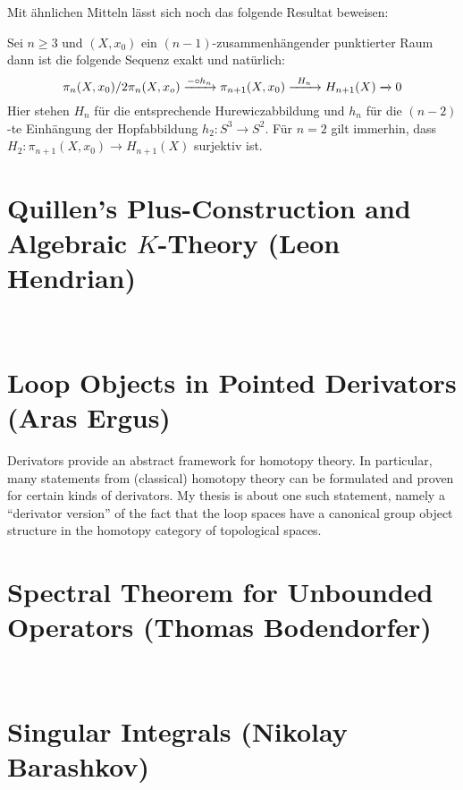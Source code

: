 Mit ähnlichen Mitteln lässt sich noch das folgende Resultat beweisen:
\begin{satz}
Sei $n \geq 3$ und $(X,x_0)$ ein $(n-1)$-zusammenhängender punktierter Raum
dann ist die folgende Sequenz exakt und natürlich:
\[
\pi_n(X,x_0)/2\pi_n(X,x_o) \xrightarrow{- \circ h_n} \pi_{n+1}(X,x_0)
\xrightarrow{\hspace{1ex} H_n \hspace{1ex}} H_{n+1}(X) \xrightarrow{} 0
\]
Hier stehen $H_n$ für die entsprechende Hurewiczabbildung und $h_n$ für die
$(n-2)$-te Einhängung der Hopfabbildung $h_2 \colon S^3 \to S^2$. Für $n = 2$
gilt immerhin, dass $H_2 \colon \pi_{n+1}(X,x_0) \to H_{n+1}(X)$ surjektiv ist.
\end{satz}

\section{Quillen's Plus-Construction and Algebraic $K$-Theory (Leon Hendrian)}

\

\section{Loop Objects in Pointed Derivators (Aras Ergus)}

Derivators provide an abstract framework for homotopy
theory. In particular, many statements from (classical) homotopy theory
can be formulated and proven for certain kinds of derivators. My thesis
is about one such statement, namely a ``derivator version'' of the fact that
the loop spaces have a canonical group object structure in the homotopy
category of topological spaces.

\section{Spectral Theorem for Unbounded Operators (Thomas Bodendorfer)}

\

\section{Singular Integrals (Nikolay Barashkov)}

\ 
